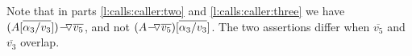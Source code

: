 Note that in  parts \ref{l:calls:caller:two} and \ref{l:calls:caller:three} we have ${\PushASLong  {\overline {v_5}}   {{(A[\overline {\alpha_3/v_3}])}}}$, and not $({\PushASLong  {\overline {v_5}}   A})[\overline {\alpha_3/v_3}]$.  The two assertions differ when $\overline {v_5}$ and $\overline {v_3}$ overlap.
%
%  
%
%
%
%
%
